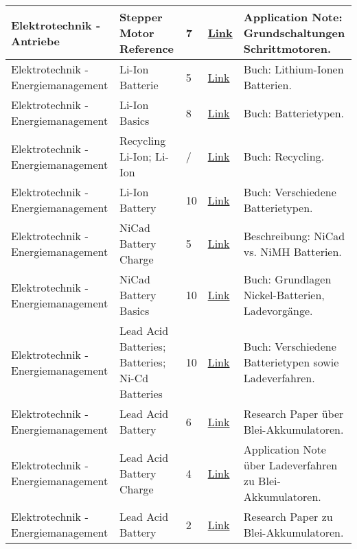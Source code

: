 \documentclass[main.tex]{subfiles} %
\begin{document}
\begin{longtable}{@{} L{2.5cm} L{2.9cm} C{1cm} L{1.2cm} L{6cm} @{}}
Elektrotechnik - Antriebe & Stepper Motor Reference & 7 & \href{https://www.silabs.com/documents/public/application-notes/an155.pdf}{Link} & Application Note: Grundschaltungen Schrittmotoren. \\
\hline
Elektrotechnik - Energiemanagement & Li-Ion Batterie & 5 & \href{https://learning.oreilly.com/library/view/lithium-ion-batteries/9781466557338/}{Link} & Buch: Lithium-Ionen Batterien. \\
\hline
Elektrotechnik - Energiemanagement & Li-Ion Basics & 8 & \href{https://link.springer.com/book/10.1007/978-3-662-53071-9}{Link} & Buch: Batterietypen. \\
\hline
Elektrotechnik - Energiemanagement & Recycling Li-Ion; Li-Ion & / & \href{https://link.springer.com/book/10.1007/978-3-319-70572-9}{Link} & Buch: Recycling. \\
\hline
Elektrotechnik - Energiemanagement & Li-Ion Battery & 10 & \href{https://learning.oreilly.com/library/view/fundamentals-and-applications/9781118414781/}{Link} & Buch: Verschiedene Batterietypen. \\
\hline
Elektrotechnik - Energiemanagement & NiCad Battery Charge & 5 & \href{https://www.servocity.com/nicad-vs-nimh-batteries}{Link} & Beschreibung: NiCad vs. NiMH Batterien. \\
\hline
Elektrotechnik - Energiemanagement & NiCad Battery Basics & 10 & \href{https://learning.oreilly.com/library/view/rechargeable-batteries-applications/9780750670067/}{Link} & Buch: Grundlagen Nickel-Batterien, Ladevorgänge. \\
\hline
Elektrotechnik - Energiemanagement & Lead Acid Batteries; Batteries; Ni-Cd Batteries & 10 & \href{https://app.knovel.com/kn/resources/kpRBHPA003/toc}{Link} & Buch: Verschiedene Batterietypen sowie Ladeverfahren. \\
\hline
Elektrotechnik - Energiemanagement & Lead Acid Battery & 6 & \href{https://www.researchgate.net/publication/357913548\_LEAD-ACID\_BATTERY}{Link} & Research Paper über Blei-Akkumulatoren. \\
\hline
Elektrotechnik - Energiemanagement & Lead Acid Battery Charge & 4 & \href{https://www.ti.com/lit/an/slua055/slua055.pdf}{Link} & Application Note über Ladeverfahren zu Blei-Akkumulatoren. \\
\hline
Elektrotechnik - Energiemanagement & Lead Acid Battery & 2 & \href{https://ieeexplore.ieee.org/document/8684661}{Link} & Research Paper zu Blei-Akkumulatoren. \\


\end{longtable}
\end{document}
